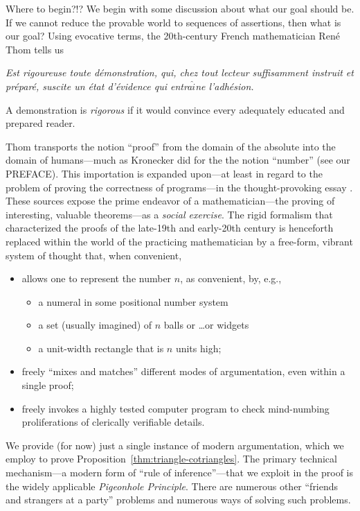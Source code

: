 Where to begin?!?  We begin with some discussion about what our goal
should be.  If we cannot reduce the provable world to sequences of
assertions, then what is our goal?  Using evocative terms, the
20th-century French mathematician Ren\'{e} Thom 
tells us

\bigskip

\begin{minipage}{0.95\textwidth}
{\em Est rigoureuse toute d\'{e}monstration, qui, chez tout lecteur
  suffisamment instruit et pr\'{e}par\'{e}, suscite un \'{e}tat
  d'\'{e}vidence qui entra$\hat{i}$ne l'adh\'{e}sion.}

\smallskip

A demonstration is {\em rigorous} if it would convince every
adequately educated and prepared reader.
\end{minipage}

\bigskip

\noindent
Thom transports the notion ``proof'' from the domain of the absolute
into the domain of humans---much as Kronecker did for the the notion
``number'' (see our PREFACE).  This importation is expanded upon---at
least in regard to the problem of proving the correctness of
programs---in the thought-provoking essay \cite{DeMilloLP79}.  These
sources expose the prime endeavor of a mathematician---the proving of
interesting, valuable theorems---as a {\em social exercise}.  The
rigid formalism that characterized the proofs of the late-19th and
early-20th century is henceforth replaced within the world of the
practicing mathematician by a free-form, vibrant system of thought
that, when convenient,
\begin{itemize}
\item
allows one to represent the number $n$, as convenient, by, e.g.,
  \begin{itemize}
  \item
a numeral in some positional number system
  \item
a set (usually imagined) of $n$ balls or \ldots or widgets
  \item
a unit-width rectangle that is $n$ units high;
  \end{itemize}

\item
freely ``mixes and matches'' different modes of argumentation, even
within a single proof;

\item
freely invokes a highly tested computer program to check mind-numbing
proliferations of clerically verifiable details.
\end{itemize}
We provide (for now) just a single instance of modern argumentation,
which we employ to prove Proposition~\ref{thm:triangle-cotriangles}.
The primary technical mechanism---a modern form of ``rule of
inference''---that we exploit in the proof is the widely applicable
{\it Pigeonhole Principle}.  There are
numerous other ``friends and strangers at a party'' problems and
numerous ways of solving such problems.

